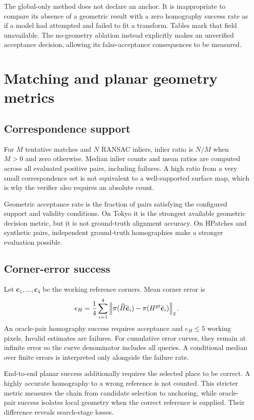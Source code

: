 The global-only method does not declare an anchor. It is inappropriate to compare its absence of a geometric result with a zero homography success rate as if a model had attempted and failed to fit a transform. Tables mark that field unavailable. The no-geometry ablation instead explicitly makes an unverified acceptance decision, allowing its false-acceptance consequences to be measured.

\section{Matching and planar geometry metrics}
\subsection{Correspondence support}
For $M$ tentative matches and $N$ RANSAC inliers, inlier ratio is $N/M$ when $M>0$ and zero otherwise. Median inlier counts and mean ratios are computed across all evaluated positive pairs, including failures. A high ratio from a very small correspondence set is not equivalent to a well-supported surface map, which is why the verifier also requires an absolute count.

Geometric acceptance rate is the fraction of pairs satisfying the configured support and validity conditions. On Tokyo it is the strongest available geometric decision metric, but it is not ground-truth alignment accuracy. On HPatches and synthetic pairs, independent ground-truth homographies make a stronger evaluation possible.

\subsection{Corner-error success}
Let $\mathbf c_1,\ldots,\mathbf c_4$ be the working reference corners. Mean corner error is
\begin{equation}
 e_H=\frac14\sum_{i=1}^4
 \left\lVert\pi(\widehat H\widetilde{\mathbf c}_i)-\pi(H^{\mathrm{gt}}\widetilde{\mathbf c}_i)\right\rVert_2.
\end{equation}
An oracle-pair homography success requires acceptance and $e_H\leq5$ working pixels. Invalid estimates are failures. For cumulative error curves, they remain at infinite error so the curve denominator includes all queries. A conditional median over finite errors is interpreted only alongside the failure rate.

End-to-end planar success additionally requires the selected place to be correct. A highly accurate homography to a wrong reference is not counted. This stricter metric measures the chain from candidate selection to anchoring, while oracle-pair success isolates local geometry when the correct reference is supplied. Their difference reveals search-stage losses.

